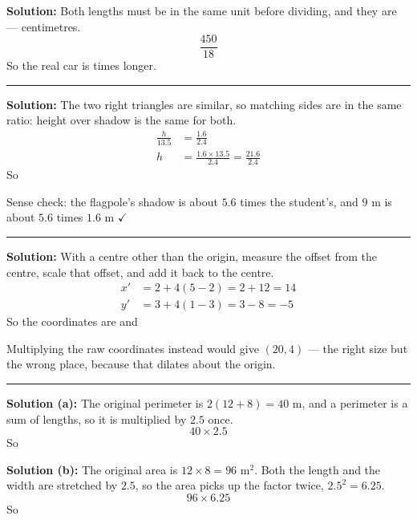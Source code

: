 \documentclass[12pt]{article}
\begin{document}

\textbf{Solution:} Both lengths must be in the same unit before dividing, and they are --- centimetres.
\[ \frac{450}{18} \]
So the real car is  times longer.

\vspace{0.2cm}\noindent\rule{\linewidth}{0.2pt}


\textbf{Solution:} The two right triangles are similar, so matching sides are in the same ratio: height over shadow is the same for both.
\begin{align*}
  \frac{h}{13.5} &= \frac{1.6}{2.4} \\
  h &= \frac{1.6 \times 13.5}{2.4} = \frac{21.6}{2.4}
\end{align*}
So 

Sense check: the flagpole's shadow is about $5.6$ times the student's, and $9$ m is about $5.6$ times $1.6$ m $\checkmark$

\vspace{0.2cm}\noindent\rule{\linewidth}{0.2pt}


\textbf{Solution:} With a centre other than the origin, measure the offset from the centre, scale that offset, and add it back to the centre.
\begin{align*}
  x' &= 2 + 4(5 - 2) = 2 + 12 = 14 \\
  y' &= 3 + 4(1 - 3) = 3 - 8 = -5
\end{align*}
So the coordinates are  and 

Multiplying the raw coordinates instead would give $(20, 4)$ --- the right size but the wrong place, because that dilates about the origin.

\vspace{0.2cm}\noindent\rule{\linewidth}{0.2pt}


\textbf{Solution (a):} The original perimeter is $2(12 + 8) = 40$ m, and a perimeter is a sum of lengths, so it is multiplied by $2.5$ once.
\[ 40 \times 2.5 \]
So 

\textbf{Solution (b):} The original area is $12 \times 8 = 96$ m$^2$. Both the length and the width are stretched by $2.5$, so the area picks up the factor twice, $2.5^2 = 6.25$.
\[ 96 \times 6.25 \]
So 
\end{document}
